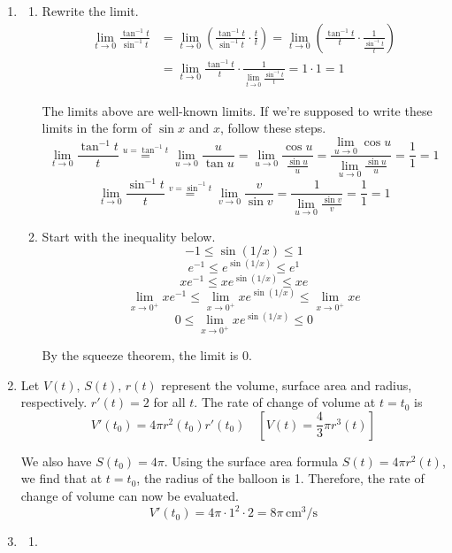 \documentclass[a4paper, 12pt]{article}
\begin{document}
\begin{enumerate}[leftmargin=*,label=\textbf{\arabic*.}]
\item
\begin{enumerate}[leftmargin=*,label=\textbf{\alph*.}]
\item Rewrite the limit.
\begin{align*}
\lim_{t\to 0} \frac{\tan^{-1} t}{\sin^{-1} t}&= \lim_{t\to 0}\left( \frac{\tan^{-1} t}{\sin^{-1}t} \cdot\frac tt\right) = \lim_{t\to 0}\left( \frac{\tan^{-1} t}{t} \cdot\frac1{\frac {\sin^{-1}t}t}\right)\\[1em]&=\lim_{t\to0}\frac{\tan^{-1}t}t\cdot\frac1{\displaystyle\lim_{t\to 0}\frac{\sin^{-1}t}t}=1\cdot1=\boxed1
\end{align*}

The limits above are well-known limits. If we're supposed to write these limits in the form of $\sin x$ and $x$, follow these steps.
\[\lim_{t\to0}\frac{\tan^{-1} t}{t}\overset{u=\tan^{-1} t}{=}\lim_{u\to0}\frac u{\tan u} = \lim_{u\to0}\frac{\cos u}{\frac{\sin u}u}=\frac{\displaystyle \lim_{u\to0}\cos u}{\displaystyle\lim_{u\to0}\frac{\sin u}u} = \frac11 = 1\]
\[\lim_{t\to0}\frac{\sin^{-1} t}{t}\overset{v=\sin^{-1} t}{=}\lim_{v\to0}\frac v{\sin v} =\frac1{\displaystyle\lim_{u\to0}\frac{\sin v}v} = \frac11 = 1\]

\item Start with the inequality below.
\[-1\leq\sin(1/x) \leq 1\]
\[ e^{-1}\leq e^{\sin(1/x)} \leq  e^1\]
\[x e^{-1}\leq x e^{\sin(1/x)} \leq x e\]
\[\lim_{x\to0^+}x e^{-1}\leq \lim_{x\to0^+}x e^{\sin(1/x)} \leq\lim_{x\to0^+}x e\]
\[0\leq \lim_{x\to0^+}x e^{\sin(1/x)} \leq0\]

By the squeeze theorem, the limit is $\boxed{0}$.
\end{enumerate}

\item Let $V(t),\,S(t),\,r(t)$ represent the volume, surface area and radius, respectively. $r'(t) = 2$ for all $t$. The rate of change of volume at $t=t_0$ is
\[V'(t_0) = 4\pi r^2(t_0)r'(t_0) \quad\left[V(t) = \frac43 \pi r^3(t)\right] \]

We also have $S(t_0) = 4\pi$. Using the surface area formula $S(t) = 4\pi r^2(t)$, we find that at $t=t_0$, the radius of the balloon is 1. Therefore, the rate of change of volume can now be evaluated.
\[V'(t_0)=4\pi\cdot1^2\cdot2=\boxed{8\pi\,\text{cm}^3\text{/s}}\]

\newpage
\item
\begin{enumerate}[leftmargin=*,label=\textbf{\alph*.}]
\item \leavevmode


\end{enumerate}
\end{enumerate}
\end{document}
